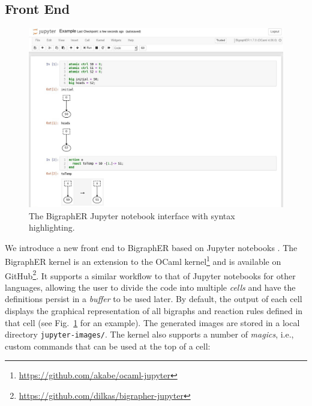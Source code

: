 \documentclass[runningheads]{llncs}
\begin{document}
\subsection{Front End}

\begin{figure}
  \centering
  \includegraphics[width=\textwidth]{images/jupyter.jpg}
  \caption{The BigraphER Jupyter notebook interface with syntax highlighting.}
  \label{interface}
\end{figure}

We introduce a new front end to BigraphER based on Jupyter notebooks
\cite{DBLP:conf/elpub/KluyverRPGBFKHG16}. The BigraphER kernel is an extension
to the OCaml kernel\footnote{\url{https://github.com/akabe/ocaml-jupyter}} and
is available on
GitHub\footnote{\url{https://github.com/dilkas/bigrapher-jupyter}}. It supports
a similar workflow to that of Jupyter notebooks for other languages, allowing
the user to divide the code into multiple \emph{cells} and have the definitions
persist in a \emph{buffer} to be used later. By default, the output of each cell
displays the graphical representation of all bigraphs and reaction rules defined
in that cell (see Fig.~\ref{interface} for an example). The generated images are
stored in a local directory \texttt{jupyter-images/}. The kernel also supports a
number of \emph{magics}, i.e., custom commands that can be used at the top of a
cell:
\end{document}
